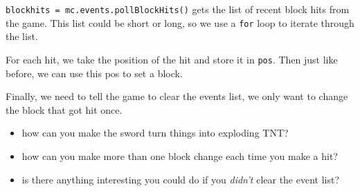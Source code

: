 \texttt{blockhits = mc.events.pollBlockHits()} gets the list of recent block hits from the game. This list could be short or long, so we use a \texttt{for} loop to iterate through the list.

For each hit, we take the position of the hit and store it in \texttt{pos}. Then just like before, we can use this pos to set a block.

Finally, we need to tell the game to clear the events list, we only want to change the block that got hit once.

\begin{itemize}[noitemsep]
	\item how can you make the sword turn things into exploding TNT?
	\item how can you make more than one block change each time you make a hit?
	\item is there anything interesting you could do if you \textit{didn't} clear the event list?
\end{itemize}